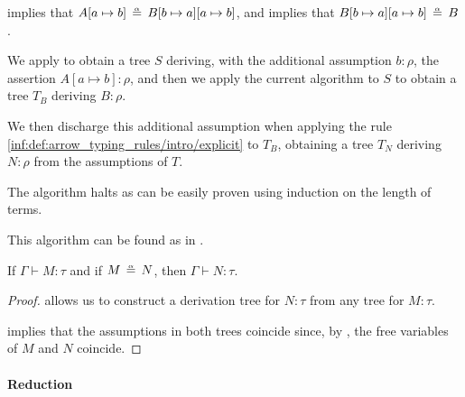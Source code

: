 \begin{algorithm}
\begin{thmenum}
\begin{thmenum}
       implies that \( A[a \mapsto b] \aequiv B[b \mapsto a][a \mapsto b] \), and  implies that \( B[b \mapsto a][a \mapsto b] \aequiv B \).

      We apply  to obtain a tree \( S \) deriving, with the additional assumption \( b: \rho \), the assertion \( A[a \mapsto b]: \rho \), and then we apply the current algorithm to \( S \) to obtain a tree \( T_B \) deriving \( B: \rho \).

      We then discharge this additional assumption when applying the rule \ref{inf:def:arrow_typing_rules/intro/explicit} to \( T_B \), obtaining a tree \( T_N \) deriving \( N: \rho \) from the assumptions of \( T \).
    \end{thmenum}
  \end{thmenum}
\end{algorithm}
\begin{defproof}
  The algorithm halts as can be easily proven using induction on the length of terms.
\end{defproof}
\begin{comments}
  \item This algorithm can be found as  in \cite{notebook:code}.
\end{comments}

\begin{proposition}\label{thm:alpha_equivalent_term_typing}
  If \( \Gamma \vdash M: \tau \) and if \( M \aequiv N \), then \( \Gamma \vdash N: \tau \).
\end{proposition}
\begin{proof}
   allows us to construct a derivation tree for \( N: \tau \) from any tree for \( M: \tau \).

   implies that the assumptions in both trees coincide since, by , the free variables of \( M \) and \( N \) coincide.
\end{proof}

\paragraph{Reduction}

